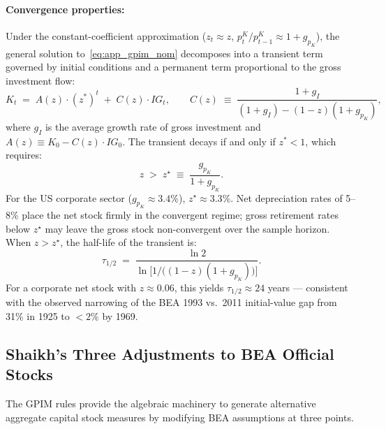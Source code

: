 \paragraph{Convergence properties:}
Under the constant-coefficient approximation
($z_t \approx z$, $p_t^{K}/p_{t-1}^{K} \approx 1 + g_{p_K}$), the
general solution to~\eqref{eq:app_gpim_nom} decomposes into a transient
term governed by initial conditions and a permanent term proportional to
the gross investment flow:
%
\begin{equation}
  \label{eq:app_gen_solution}
  K_t \;=\; A(z)\cdot(z^{\ast})^t \;+\; C(z)\cdot IG_t,
  \qquad
  C(z) \;\equiv\;
  \frac{1+g_I}{(1+g_I)-(1-z)(1+g_{p_K})},
\end{equation}
%
where $g_I$ is the average growth rate of gross investment and
$A(z) \equiv K_0 - C(z)\cdot IG_0$. The transient decays if and only if
$z^{\ast} < 1$, which requires:
%
\begin{equation}
  \label{eq:app_critical_z}
  z \;>\; z^{\star} \;\equiv\; \frac{g_{p_K}}{1+g_{p_K}}.
\end{equation}
%
For the US corporate sector ($g_{p_K} \approx 3.4\%$),
$z^{\star} \approx 3.3\%$. Net depreciation rates of 5--8\% place the
net stock firmly in the convergent regime; gross retirement rates below
$z^{\star}$ may leave the gross stock non-convergent over the sample
horizon. When $z > z^{\star}$, the half-life of the transient is:
%
\begin{equation}
  \label{eq:app_halflife}
  \tau_{1/2} \;=\;
  \frac{\ln 2}{\ln\!\bigl[1/\bigl((1-z)(1+g_{p_K})\bigr)\bigr]}.
\end{equation}
%
For a corporate net stock with $z \approx 0.06$, this yields
$\tau_{1/2} \approx 24$ years --- consistent with the observed narrowing
of the BEA 1993 vs.\ 2011 initial-value gap from 31\% in 1925 to
$<2\%$ by 1969.


\subsection{Shaikh's Three Adjustments to BEA Official Stocks}
\label{app:gpim_adjustments}

The GPIM rules provide the algebraic machinery to generate alternative
aggregate capital stock measures by modifying BEA assumptions at three
points.

